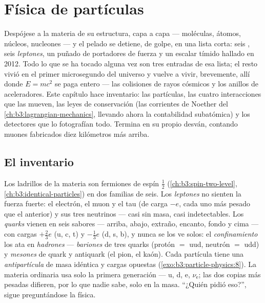 \chapter{Física de partículas}\label{ch:b3:particle-physics}


Despójese a la materia de su estructura, capa a capa --- moléculas, átomos,
núcleos, nucleones --- y el pelado se detiene, de golpe, en una lista corta:
seis \emph{}, seis \emph{leptones}, un puñado de portadores de fuerza
y un escalar tímido hallado en 2012. Todo lo que se ha tocado alguna vez son
tres entradas de esa lista; el resto vivió en el primer microsegundo del
universo y vuelve a vivir, brevemente, allí donde
$E = mc^2$ se paga entero --- las colisiones de rayos cósmicos y los anillos
de aceleradores. Este capítulo hace inventario: las partículas, las cuatro
interacciones que las mueven, las leyes de conservación
(las corrientes de Noether del \cref{ch:b3:lagrangian-mechanics}, llevando ahora la
contabilidad subatómica) y los detectores que lo fotografían todo. Termina
en su propio desván, contando muones fabricados diez kilómetros más arriba.

\section{El inventario}

\begin{definition}\label{def:b3:particle-physics:zoo}
Los ladrillos de la materia son fermiones de espín $\tfrac12$
(\cref{ch:b3:spin-two-level}, \cref{ch:b3:identical-particles}) en
dos familias de seis. Los \emph{leptones} no sienten la fuerza fuerte: el
electrón, el muon y el tau (de carga $-e$, cada uno más pesado que el anterior)
y sus tres neutrinos --- casi sin masa, casi
indetectables. Los \emph{quarks} vienen en seis sabores --- arriba, abajo,
extraño, encanto, fondo y cima --- con cargas $+\tfrac23e$ (u, c,
t) y $-\tfrac13e$ (d, s, b), y nunca se los ve solos:
el \emph{confinamiento} los ata en \emph{hadrones} --- \emph{bariones} de
tres quarks (protón $=$ uud, neutrón $=$ udd) y
\emph{mesones} de quark y antiquark (el pion, el kaón). Cada partícula tiene una
\emph{antipartícula} de masa idéntica y cargas opuestas
(\cref{exo:b3:particle-physics:8}). La materia ordinaria usa solo la
primera generación --- u, d, e, $\nu_{\text{e}}$; las dos copias más pesadas
difieren, por lo que nadie sabe, solo en la masa. ``¿Quién
pidió eso?'', sigue preguntándose la física.
\end{definition}

